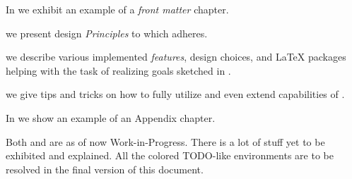  \label{ch:Quick Summary}

\vspace{2ex} %


In \textbf{} we exhibit an example of a \emph{front matter} chapter.

 we present design \emph{Principles} to which \TeXtured{} adheres.

 we describe various implemented \emph{features}, design choices, and \LaTeX{} packages helping with the task of realizing goals sketched in .

 we give tips and tricks on how to fully utilize and even extend capabilities of \TeXtured{}.

In \textbf{} we show an example of an Appendix chapter.

\begin{Note}
    Both  and  are as of now Work-in-Progress.
    There is a lot of stuff yet to be exhibited and explained.
    All the colored \textsf{TODO}-like environments are to be resolved in the final version of this document.
\end{Note}
